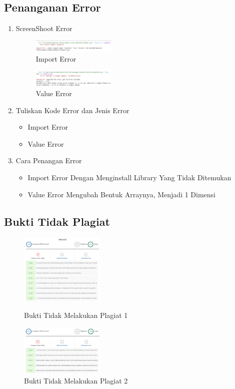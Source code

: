 \subsection{Penanganan Error}
\begin{enumerate}
	\item ScreenShoot Error
	\begin{figure}[H]
		\includegraphics[width=4cm]{figures/1174070/1/error/1.png}
		\centering
		\caption{Import Error}
	\end{figure}
	\begin{figure}[H]
		\includegraphics[width=4cm]{figures/1174070/1/error/2.png}
		\centering
		\caption{Value Error}
	\end{figure}
	\item Tuliskan Kode Error dan Jenis Error
	\begin{itemize}
		\item Import Error
		\item Value Error
	\end{itemize}
	\item Cara Penangan Error
	\begin{itemize}
		\item Import Error
		\hfill\break
		Dengan Menginstall Library Yang Tidak Ditemukan
		\item Value Error
		\hfill\break
		Mengubah Bentuk Arraynya, Menjadi 1 Dimensi
	\end{itemize}
\end{enumerate}
\subsection{Bukti Tidak Plagiat}
\begin{figure}[H]
	\includegraphics[width=4cm]{figures/1174070/1/plagiat/1.PNG}
	\centering
	\caption{Bukti Tidak Melakukan Plagiat 1}
    \includegraphics[width=4cm]{figures/1174070/1/plagiat/2.PNG}
	\centering
	\caption{Bukti Tidak Melakukan Plagiat 2}
\end{figure}